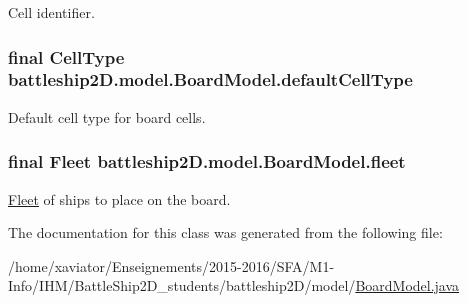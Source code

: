 Cell identifier. 

\hypertarget{classbattleship2D_1_1model_1_1BoardModel_a0b9c7c69532e0643f423711e0e5f478e}{
\subsubsection[{default\-Cell\-Type}]{\setlength{\rightskip}{0pt plus 5cm}final {\bf Cell\-Type} battleship2\-D.\-model.\-Board\-Model.\-default\-Cell\-Type\hspace{0.3cm}{\ttfamily [private]}}}\label{classbattleship2D_1_1model_1_1BoardModel_a0b9c7c69532e0643f423711e0e5f478e}


Default cell type for board cells. 

\hypertarget{classbattleship2D_1_1model_1_1BoardModel_a31a41118d87b809557a0d3579068efe9}{
\subsubsection[{fleet}]{\setlength{\rightskip}{0pt plus 5cm}final {\bf Fleet} battleship2\-D.\-model.\-Board\-Model.\-fleet\hspace{0.3cm}{\ttfamily [protected]}}}\label{classbattleship2D_1_1model_1_1BoardModel_a31a41118d87b809557a0d3579068efe9}


\hyperlink{classbattleship2D_1_1model_1_1Fleet}{Fleet} of ships to place on the board. 



The documentation for this class was generated from the following file\-:\begin{DoxyCompactItemize}
\item 
/home/xaviator/\-Enseignements/2015-\/2016/\-S\-F\-A/\-M1-\/\-Info/\-I\-H\-M/\-Battle\-Ship2\-D\-\_\-students/battleship2\-D/model/\hyperlink{BoardModel_8java}{Board\-Model.\-java}\end{DoxyCompactItemize}
